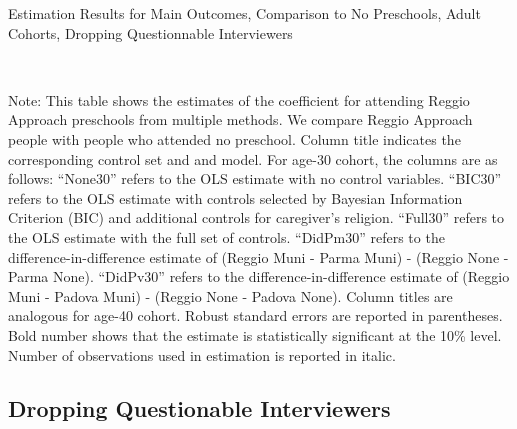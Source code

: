 \begin{table}[H] \caption{Estimation Results for Main Outcomes, Comparison to No Preschools, Adult Cohorts, Dropping Questionnable Interviewers} \label{ols-M-adult-reg-nopres-dropint}
\scalebox{0.75}{}
\vspace{1ex} \\
\footnotesize\raggedright{Note: This table shows the estimates of the coefficient for attending Reggio Approach preschools from multiple methods. We compare Reggio Approach people with people who attended no preschool. Column title indicates the corresponding control set and and model. For age-30 cohort, the columns are as follows: ``None30'' refers to the OLS estimate with no control variables. ``BIC30'' refers to the OLS estimate with controls selected by Bayesian Information Criterion (BIC) and additional controls for caregiver's religion. ``Full30'' refers to the OLS estimate with the full set of controls. ``DidPm30'' refers to the difference-in-difference estimate of (Reggio Muni - Parma Muni) - (Reggio None - Parma None). ``DidPv30'' refers to the difference-in-difference estimate of (Reggio Muni - Padova Muni) - (Reggio None - Padova None).   Column titles are analogous for age-40 cohort. Robust standard errors are reported in parentheses. Bold number shows that the estimate is statistically significant at the 10\% level. Number of observations used in estimation is reported in italic.}
\end{table}



































\subsection{Dropping Questionable Interviewers}



